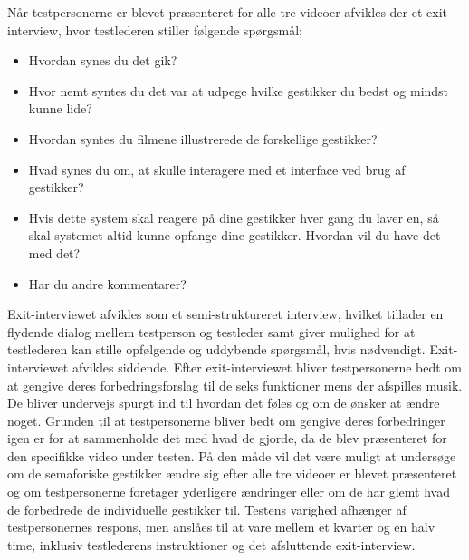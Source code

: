 Når testpersonerne er blevet præsenteret for alle tre videoer afvikles der et exit-interview, hvor testlederen stiller følgende spørgsmål; \blankline
%
\begin{itemize}
  \item Hvordan synes du det gik? 
  \item Hvor nemt syntes du det var at udpege hvilke gestikker du bedst og mindst kunne lide? 
  \item Hvordan syntes du filmene illustrerede de forskellige gestikker? 
  \item Hvad synes du om, at skulle interagere med et interface ved brug af gestikker? 
  \item Hvis dette system skal reagere på dine gestikker hver gang du laver en, så skal systemet altid kunne opfange dine gestikker. Hvordan vil du have det med det? 
  \item Har du andre kommentarer?\blankline
\end{itemize}
\noindent
%
Exit-interviewet afvikles som et semi-struktureret interview, hvilket tillader en flydende dialog mellem testperson og testleder samt giver mulighed for at testlederen kan stille opfølgende og uddybende spørgsmål, hvis nødvendigt. Exit-interviewet afvikles siddende. Efter exit-interviewet bliver testpersonerne bedt om at gengive deres forbedringsforslag til de seks funktioner mens der afspilles musik. De bliver undervejs spurgt ind til hvordan det føles og om de ønsker at ændre noget. Grunden til at testpersonerne bliver bedt om gengive deres forbedringer igen er for at sammenholde det med hvad de gjorde, da de blev præsenteret for den specifikke video under testen. På den måde vil det være muligt at undersøge om de semaforiske gestikker ændre sig efter alle tre videoer er blevet præsenteret og om testpersonerne foretager yderligere ændringer eller om de har glemt hvad de forbedrede de individuelle gestikker til. \blankline   
%
Testens varighed afhænger af testpersonernes respons, men anslåes til at vare mellem et kvarter og en halv time, inklusiv testlederens instruktioner og det afsluttende exit-interview.
%
